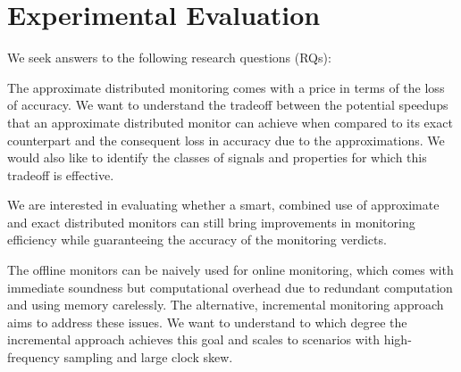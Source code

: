 \section{Experimental Evaluation} 
\label{sec:experiments}



We seek answers to the following research questions (RQs):
\begin{resq}
The approximate distributed monitoring comes with a price in terms of the loss of accuracy.
We want to understand the tradeoff between the potential speedups that an approximate distributed monitor can achieve when compared to its exact counterpart and the consequent loss in accuracy due to the approximations.
We would also like to identify the classes of signals and properties for which this tradeoff is effective. 
\end{resq}
\begin{resq}
We are interested in evaluating whether a smart, combined use of approximate and exact distributed monitors can still bring improvements in monitoring efficiency while guaranteeing the accuracy of the monitoring verdicts. 
\end{resq}
\bgroup \color{red}
\begin{resq}
The offline monitors can be naively used for online monitoring, which comes with immediate soundness but computational overhead due to redundant computation and using memory carelessly.
The alternative, incremental monitoring approach aims to address these issues.
We want to understand to which degree the incremental approach achieves this goal and scales to scenarios with high-frequency sampling and large clock skew.
\end{resq}
\egroup

